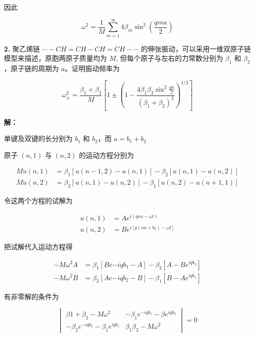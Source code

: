 因此

\begin{equation*}
    \omega^2 = \frac{1}{M} \sum_{m=1}^{\infty} 4\beta_m \sin^2 \left(\frac{qma}{2}\right)
\end{equation*}

\noindent \textbf{2.\quad} 聚乙烯链 $\cdots-CH=CH-CH=CH-\cdots$ 的伸张振动，可以采用一维双原子链模型来描述，原胞两原子质量均为 $M$, 但每个原子与左右的力常数分别为 $\beta_1$ 和 $\beta_2$，原子链的周期为 $a$。证明振动频率为

\begin{equation*}
    \omega_\pm^2 = \frac{\beta_1+\beta_2}{M} \left[1 \pm \left(1 - \frac{4\beta_1 \beta_2 \sin^2 \frac{qa}{2}}{(\beta_1+\beta_2)^2}\right)^{1/2}\right]
\end{equation*}

\noindent \textbf{解：}

单键及双键的长分别为 $b_1$ 和 $b_2$，而 $a=b_1+b_2$

原子 $(n, 1)$ 与 $(n, 2)$ 的运动方程分别为

\begin{align*}
    M \ddot{u}(n, 1) &= \beta_1 [u(n-1, 2)-u(n, 1)] - \beta_2 [u(n, 1)-u(n, 2)] \\
    M \ddot{u}(n, 2) &= \beta_2 [u(n, 1)-u(n, 2)] - \beta_1 [u(n, 2)-u(n+1, 1)]
\end{align*}

令这两个方程的试解为

\begin{align*}
    u(n, 1) &= A e^{i(qna-\omega t)} \\
    u(n, 2) &= B e^{i[q(na+b_2)-\omega t]}
\end{align*}

把试解代入运动方程得

\begin{align*}
    -M \omega^2 A &= \beta_1 [B e{-iq b_1} - A] - \beta_2 [A - B e^{iq b_2}] \\
    -M \omega^2 B &= \beta_2 [A e{-iq b_2} - B] - \beta_1 [B - A e^{iq b_1}]
\end{align*}

有非零解的条件为

\begin{equation*}
    \begin{vmatrix}
        \beta1 + \beta_2 - M \omega^2 & -\beta_1 e^{-iq b_1} - \beta e^{iq b_2} \\
        -\beta_2 e^{-iq b_2} - \beta_1 e^{iq b_1} & \beta_1 \beta_2 - M \omega^2
    \end{vmatrix} = 0
\end{equation*}

